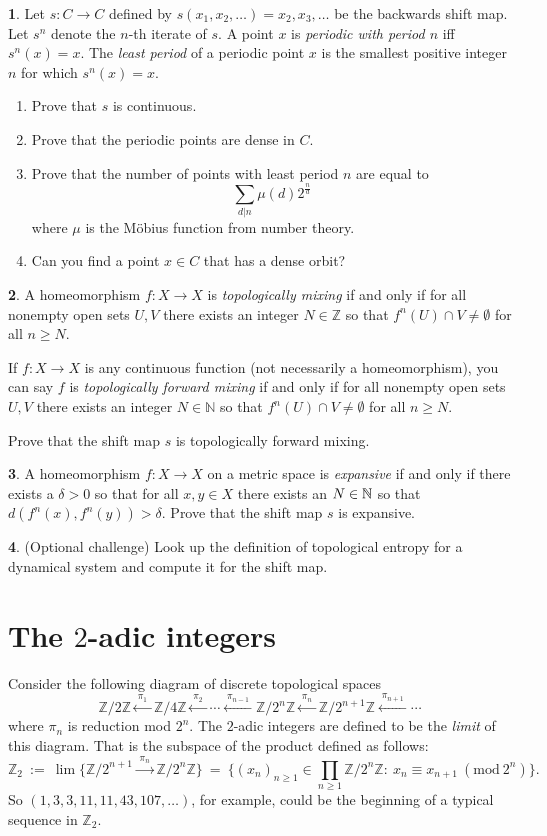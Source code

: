 \documentclass[11pt]{article}
\theoremstyle{definition}
\newtheorem{problem}{}
\newcommand{\bp}{\begin{problem}}
\newcommand{\ep}{\end{problem}\bigskip}
\theoremstyle{theorem}
\newcommand{\Z}{\mathbb{Z}}%
\begin{document}
\bp Let $s:C \to C$ defined by $s(x_1, x_2, \ldots ) = x_2, x_3, \ldots$ be the backwards shift map.  Let $s^n$ denote the $n$-th iterate of $s$.  A point $x$ is \emph{periodic with period $n$} iff $s^n(x)=x$.  The \emph{least period} of a periodic point $x$ is the smallest positive integer $n$ for which $s^n(x)=x$.
\begin{enumerate}[label=(\alph*)]
\item Prove that $s$ is continuous.
\item Prove that the periodic points are dense in $C$.
\item Prove that the number of points with least period $n$ are equal to 
\[\sum_{d \vert n} \mu(d)2^{\frac{n}{d}}
\]
where $\mu$ is the M\"obius function from number theory.
\item Can you find a point $x\in C$ that has a dense orbit?
\end{enumerate}
\ep

\bp A homeomorphism $f:X \to X$ is \emph{topologically mixing} if and only if for all nonempty open sets $U, V$ there exists an integer $N\in \mathbb{Z}$ so that $f^n(U)\cap V \neq \emptyset$ for all $n\geq N$.  

If $f:X \to X$ is any continuous function (not necessarily a homeomorphism), you can say $f$ is \emph{topologically forward mixing} if and only if for all nonempty open sets $U, V$ there exists an integer $N\in \mathbb{N}$ so that $f^n(U)\cap V \neq \emptyset$ for all $n\geq N$.  

Prove that the shift map $s$ is topologically forward mixing.
\ep


\bp A homeomorphism $f:X \to X$ on a metric space is \emph{expansive} if and only if there exists a $\delta>0$ so that for all $x,y\in X$ there exists an $N\in \mathbb{N}$ so that $d(f^n(x),f^n(y))>\delta.$  Prove that the shift map $s$ is expansive.
\ep

\bp (Optional challenge) Look up the definition of topological entropy for a dynamical system and compute it for the shift map.
\ep


\section*{The $2$-adic integers}

Consider the following diagram of discrete topological spaces 
\[
\Z/2\Z \xleftarrow{\;\pi_1\;} \Z/4\Z 
\xleftarrow{\;\pi_2\;} \cdots 
\xleftarrow{\;\pi_{n-1}\;}\Z/2^{n}\Z
\xleftarrow{\;\pi_{n}\;} \Z/2^{n+1}\Z 
\xleftarrow{\;\pi_{n+1}\;} \cdots
\]
where $\pi_n$ is reduction mod $2^n$.  The $2$-adic integers are defined to be the \emph{limit} of this diagram.  That is the subspace of the product defined as follows:
\[\Z_2\ :=\ \lim \{\Z/2^{n+1}\xrightarrow{\;\pi_{n}\;} \Z/2^n \Z\}\ = \ \Big\{(x_n)_{n\ge1}\in\prod_{n\ge1}\Z/2^n\Z:\ x_n\equiv x_{n+1}\ (\mathrm{mod}\ 2^n)\Big\}.\]
So $(1,3,3,11,11,43,107, \ldots)$, for example,  could be the beginning of a typical sequence in $\Z_2$.
\end{document}
